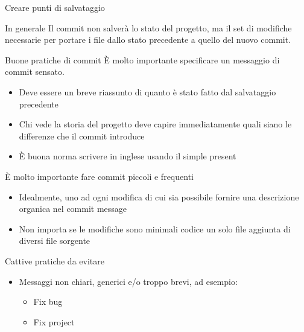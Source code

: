 \documentclass[xcolor=dvipsnames,presentation]{beamer}
\begin{document}
\begin{frame}{Creare punti di salvataggio}
\begin{block}{In generale}
        Il commit non salverà lo stato del progetto, ma il set di modifiche necessarie per portare i
file dallo stato precedente a quello del nuovo commit.
    \end{block}
    \begin{block}{Buone pratiche di commit}
        È molto importante specificare un messaggio di commit sensato.
        \begin{itemize}
            \item Deve essere un breve riassunto di quanto è stato fatto dal salvataggio precedente
            \item Chi vede la storia del progetto deve capire immediatamente quali siano le
differenze che il commit introduce
            \item È buona norma scrivere in inglese usando il simple present
        \end{itemize}
        È molto importante fare commit piccoli e frequenti
        \begin{itemize}
            \item Idealmente, uno ad ogni modifica di cui sia possibile fornire una descrizione
organica nel commit message
            \item Non importa se le modifiche sono minimali
codice
un solo file
aggiunta di diversi file sorgente
        \end{itemize}
    \end{block}
    \begin{block}{Cattive pratiche da evitare}
        \begin{itemize}
            \item Messaggi non chiari, generici e/o troppo brevi, ad esempio:
            \begin{itemize}
                \item Fix bug
                \item Fix project

\end{itemize}
\end{itemize}
\end{block}
\end{frame}
\end{document}

